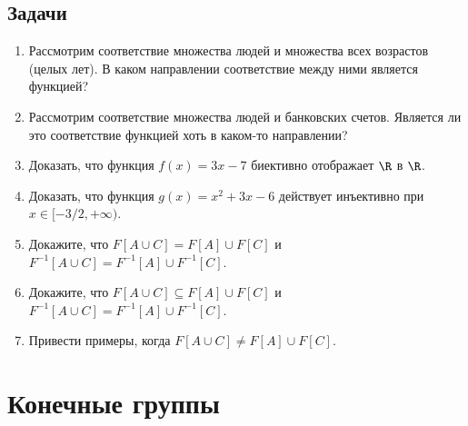 \subsection*{Задачи}
\begin{enumerate}
\item Рассмотрим соответствие множества людей и множества всех возрастов (целых лет). В каком направлении соответствие между ними является функцией?
\item Рассмотрим соответствие множества людей и банковских счетов. Является ли это соответствие функцией хоть в каком-то направлении?
\item Доказать, что функция $f(x)=3x-7$ биективно отображает $\R$ в $\R$.
\item Доказать, что функция $g(x)=x^2+3x-6$ действует инъективно при $x\in[-3/2,+\infty)$.
\item Докажите, что $F[A\cup C]=F[A]\cup F[C]$ и $F^{-1}[A\cup C]=F^{-1}[A]\cup F^{-1}[C]$.
\item Докажите, что $F[A\cup C]\subseteq F[A]\cup F[C]$ и $F^{-1}[A\cup C]=F^{-1}[A]\cup F^{-1}[C]$.
\item Привести примеры, когда $F[A\cup C]\ne F[A]\cup F[C]$.
\end{enumerate}


\section{Конечные группы}


